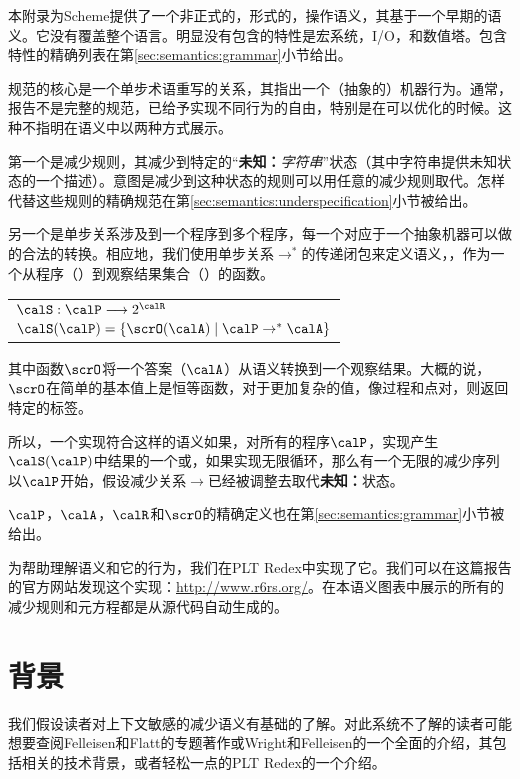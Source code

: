 
本附录为Scheme提供了一个非正式的，形式的，操作语义，其基于一个早期的语义\cite{mf:scheme-op-sem}。它没有覆盖整个语言。明显没有包含的特性是宏系统，I/O，和数值塔。包含特性的精确列表在第\ref{sec:semantics:grammar}小节给出。

规范的核心是一个单步术语重写的关系，其指出一个（抽象的）机器行为。通常，报告不是完整的规范，已给予实现不同行为的自由，特别是在可以优化的时候。这种不指明在语义中以两种方式展示。

第一个是减少规则，其减少到特定的“\textbf{未知：}\textit{字符串}”状态（其中字符串提供未知状态的一个描述）。意图是减少到这种状态的规则可以用任意的减少规则取代。怎样代替这些规则的精确规范在第\ref{sec:semantics:underspecification}小节被给出。

另一个是单步关系涉及到一个程序到多个程序，每一个对应于一个抽象机器可以做的合法的转换。相应地，我们使用单步关系$\rightarrow^*$的传递闭包来定义语义，\calS{}，作为一个从程序（\calP{}）到观察结果集合（\calR）的函数。
\begin{center}
\begin{tabular}{l}
$\calS : \calP \longrightarrow 2^{\calR}$ \\
$\calS(\calP) = \{ \scrO(\calA) \mid \calP \rightarrow^* \calA \}$
\end{tabular}
\end{center}

其中函数$\scrO$将一个答案（$\calA${}）从语义转换到一个观察结果。大概的说，$\scrO$在简单的基本值上是恒等函数，对于更加复杂的值，像过程和点对，则返回特定的标签。

所以，一个实现符合这样的语义如果，对所有的程序$\calP$，实现产生$\calS(\calP)$中结果的一个或，如果实现无限循环，那么有一个无限的减少序列以$\calP$开始，假设减少关系$\rightarrow$已经被调整去取代\textbf{未知：}状态。

$\calP$，$\calA$，$\calR$和$\scrO$的精确定义也在第\ref{sec:semantics:grammar}小节被给出。

为帮助理解语义和它的行为，我们在PLT Redex中实现了它。我们可以在这篇报告的官方网站发现这个实现：\url{http://www.r6rs.org/}。在本语义图表中展示的所有的减少规则和元方程都是从源代码自动生成的。

\section{背景}

我们假设读者对上下文敏感的减少语义有基础的了解。对此系统不了解的读者可能想要查阅Felleisen和Flatt的专题著作\cite{ff:monograph}或Wright和Felleisen\cite{wf:type-soundness}的一个全面的介绍，其包括相关的技术背景，或者轻松一点的PLT Redex\cite{mfff:plt-redex}的一个介绍。

